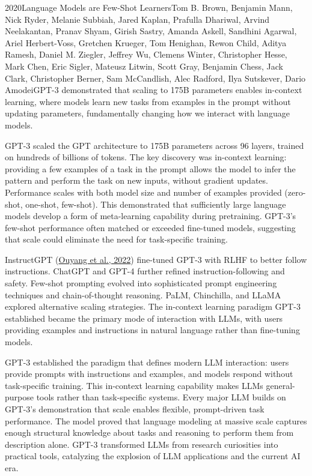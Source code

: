 
\begin{papersummary}{2020}{Language Models are Few-Shot Learners}{Tom B. Brown, Benjamin Mann, Nick Ryder, Melanie Subbiah, Jared Kaplan, Prafulla Dhariwal, Arvind Neelakantan, Pranav Shyam, Girish Sastry, Amanda Askell, Sandhini Agarwal, Ariel Herbert-Voss, Gretchen Krueger, Tom Henighan, Rewon Child, Aditya Ramesh, Daniel M. Ziegler, Jeffrey Wu, Clemens Winter, Christopher Hesse, Mark Chen, Eric Sigler, Mateusz Litwin, Scott Gray, Benjamin Chess, Jack Clark, Christopher Berner, Sam McCandlish, Alec Radford, Ilya Sutskever, Dario Amodei}{GPT-3 demonstrated that scaling to 175B parameters enables in-context learning, where models learn new tasks from examples in the prompt without updating parameters, fundamentally changing how we interact with language models.}

GPT-3 scaled the GPT architecture to 175B parameters across 96 layers, trained on hundreds of billions of tokens. The key discovery was in-context learning: providing a few examples of a task in the prompt allows the model to infer the pattern and perform the task on new inputs, without gradient updates. Performance scales with both model size and number of examples provided (zero-shot, one-shot, few-shot). This demonstrated that sufficiently large language models develop a form of meta-learning capability during pretraining. GPT-3's few-shot performance often matched or exceeded fine-tuned models, suggesting that scale could eliminate the need for task-specific training.

InstructGPT (\hyperref[paper:ouyang-2022]{Ouyang et al., 2022}) fine-tuned GPT-3 with RLHF to better follow instructions. ChatGPT and GPT-4 further refined instruction-following and safety. Few-shot prompting evolved into sophisticated prompt engineering techniques and chain-of-thought reasoning. PaLM, Chinchilla, and LLaMA explored alternative scaling strategies. The in-context learning paradigm GPT-3 established became the primary mode of interaction with LLMs, with users providing examples and instructions in natural language rather than fine-tuning models.

GPT-3 established the paradigm that defines modern LLM interaction: users provide prompts with instructions and examples, and models respond without task-specific training. This in-context learning capability makes LLMs general-purpose tools rather than task-specific systems. Every major LLM builds on GPT-3's demonstration that scale enables flexible, prompt-driven task performance. The model proved that language modeling at massive scale captures enough structural knowledge about tasks and reasoning to perform them from description alone. GPT-3 transformed LLMs from research curiosities into practical tools, catalyzing the explosion of LLM applications and the current AI era.

\end{papersummary}
